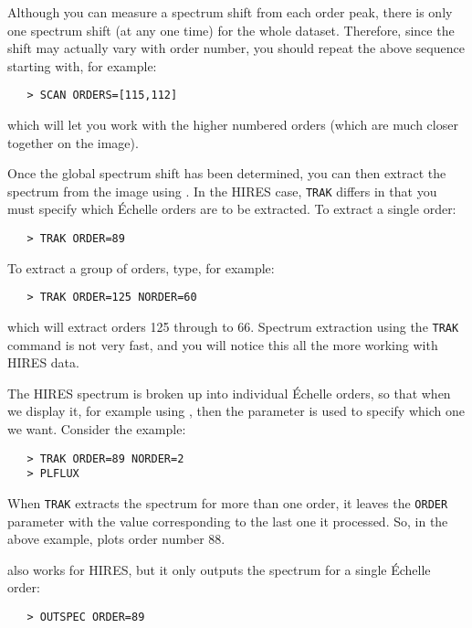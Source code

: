 Although you can measure a spectrum shift from each order peak, there is
only one spectrum shift (at any one time) for the whole dataset.
Therefore, since the shift may actually vary with order number, you
should repeat the above sequence starting with, for example:

\begin{verbatim}
   > SCAN ORDERS=[115,112]
\end{verbatim}

which will let you work with the higher numbered orders (which are much
closer together on the image)\@.

Once the global spectrum shift has been determined, you can then extract the
spectrum from the image using \@. In the HIRES 
case, \verb+TRAK+
differs in that you must specify which \'{E}chelle orders are to be extracted.
To extract a single order:

\begin{verbatim}
   > TRAK ORDER=89
\end{verbatim}

To extract a group of orders, type, for example:

\begin{verbatim}
   > TRAK ORDER=125 NORDER=60
\end{verbatim}

which will extract orders 125 through to 66.  Spectrum extraction using
the \verb+TRAK+ command is not very fast, and you will notice this all the more
working with HIRES data.

The HIRES spectrum is broken up into individual \'{E}chelle orders, so that
when we display it, for example using , 
then the 
parameter is used to specify which one we want.  Consider the example:

\begin{verbatim}
   > TRAK ORDER=89 NORDER=2
   > PLFLUX
\end{verbatim}

When \verb+TRAK+ extracts the spectrum for more than one order, it leaves the
\verb+ORDER+ parameter with the value corresponding to the last one it
processed.  So, in the above example, 
 plots order number 88.

 also works for HIRES, but it only outputs the spectrum for a
single \'{E}chelle order:

\begin{verbatim}
   > OUTSPEC ORDER=89
\end{verbatim}

